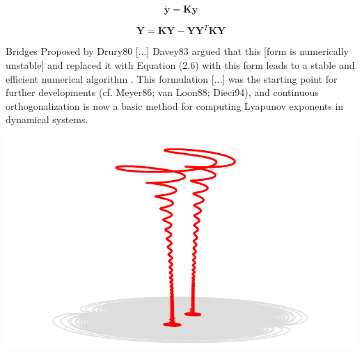 \begin{equation*}
  \dot{\mathbf{y}} = \mathbf{K} \mathbf{y}
\end{equation*}

\begin{equation*}
  \dot{\mathbf{Y}} = \mathbf{K} \mathbf{Y} - \mathbf{Y} \mathbf{Y}^T \mathbf{K} \mathbf{Y}
\end{equation*}


\begin{block}{Bridges}
Proposed by Drury80 [...] Davey83 argued that this [form is
numerically unstable] and replaced it with Equation (2.6) with this
form leads to a stable and efficient numerical algorithm . This
formulation [...] was the starting point for further developments
(cf. Meyer86; van Loon88; Dieci94), and continuous orthogonalization
is now a basic method for computing Lyapunov exponents in dynamical
systems.
\end{block}

\eframe

\begin{center}
  \includegraphics[width=\textwidth]{i/far.pdf}
\end{center}
\eframe

